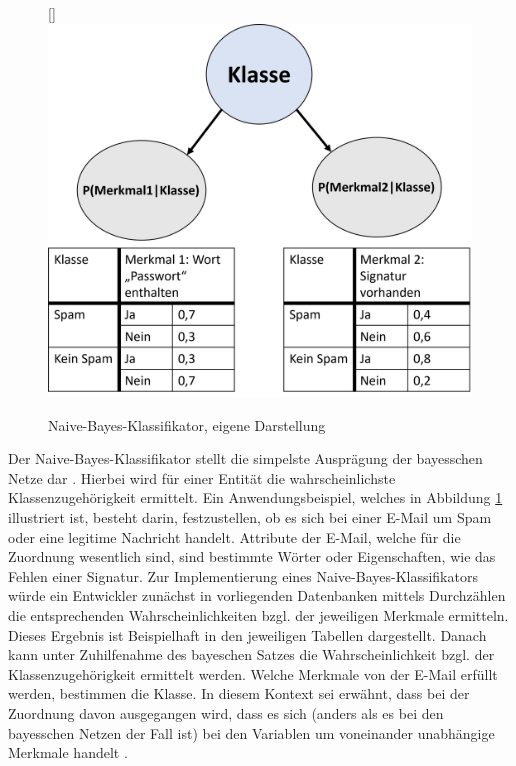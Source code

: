 \begin{figure}
    \centering
    \raisebox{0pt}[\dimexpr{}\baselineskip\relax]{\includegraphics[scale=0.39]{pic/MA-Bilder/naivebayes.png}}
    \caption{Naive-Bayes-Klassifikator, eigene Darstellung}
    \label{Fig:naivebayes}
\end{figure}
Der Naive-Bayes-Klassifikator stellt die simpelste Ausprägung der bayesschen Netze dar \cite{Dorn.2018}. Hierbei wird für einer Entität die wahrscheinlichste Klassenzugehörigkeit ermittelt. Ein Anwendungsbeispiel, welches in Abbildung \ref{Fig:naivebayes} illustriert ist, besteht darin, festzustellen, ob es sich bei einer E-Mail um Spam oder eine legitime Nachricht handelt. Attribute der E-Mail, welche für die Zuordnung wesentlich sind, sind bestimmte Wörter oder Eigenschaften, wie das Fehlen einer Signatur. Zur Implementierung eines Naive-Bayes-Klassifikators würde ein Entwickler zunächst in vorliegenden Datenbanken mittels Durchzählen die entsprechenden
Wahrscheinlichkeiten bzgl. der jeweiligen Merkmale ermitteln. Dieses Ergebnis ist Beispielhaft in den jeweiligen Tabellen dargestellt. Danach kann unter Zuhilfenahme des bayeschen Satzes die Wahrscheinlichkeit bzgl. der Klassenzugehörigkeit ermittelt werden. Welche Merkmale von der E-Mail erfüllt werden, bestimmen die Klasse. In diesem Kontext sei erwähnt, dass bei der Zuordnung davon ausgegangen wird, dass es sich (anders als es bei den bayesschen Netzen der Fall ist) bei den Variablen um voneinander unabhängige Merkmale handelt \cite{Dorn.2018}.

